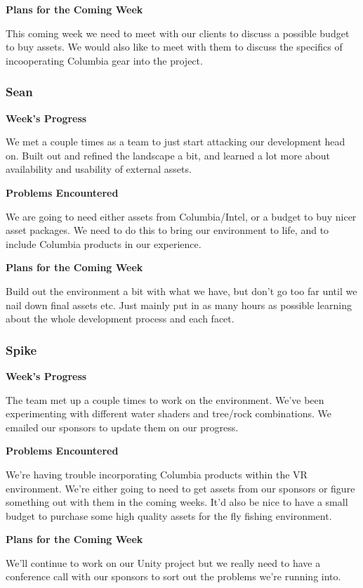 \documentclass[10pt,journal,compsoc,onecolumn, draftclsnofoot]{IEEEtran}
\begin{document}
\noindent \textbf{Plans for the Coming Week}

This coming week we need to meet with our clients to discuss a possible budget to buy assets. We would also like to meet with them to discuss the specifics of incooperating Columbia gear into the project.

\subsubsection{Sean}
\noindent \textbf{Week's Progress}

We met a couple times as a team to just start attacking our development head on. Built out and refined the landscape a bit, and learned a lot more about availability and usability of external assets.

\noindent \textbf{Problems Encountered}

We are going to need either assets from Columbia/Intel, or a budget to buy nicer asset packages.  We need to do this to bring our environment to life, and to include Columbia products in our experience.

\noindent \textbf{Plans for the Coming Week}

Build out the environment a bit with what we have, but don't go too far until we nail down final assets etc. Just mainly put in as many hours as possible learning about the whole development process and each facet.

\subsubsection{Spike}
\noindent \textbf{Week's Progress}

The team met up a couple times to work on the environment. We've been experimenting with different water shaders and tree/rock combinations. We emailed our sponsors to update them on our progress.

\noindent \textbf{Problems Encountered}

We're having trouble incorporating Columbia products within the VR environment. We're either going to need to get assets from our sponsors or figure something out with them in the coming weeks. It'd also be nice to have a small budget to purchase some high quality assets for the fly fishing environment.

\noindent \textbf{Plans for the Coming Week}

We'll continue to work on our Unity project but we really need to have a conference call with our sponsors to sort out the problems we're running into.
\end{document}
